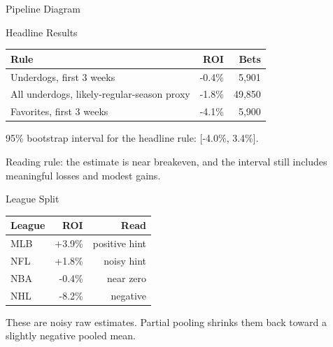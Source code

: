 \documentclass{beamer}
\begin{document}
\begin{frame}{Pipeline Diagram}
\centering
{}
\end{frame}

\begin{frame}{Headline Results}
\begin{tabular}{lrr}
\toprule
Rule & ROI & Bets \\
\midrule
Underdogs, first 3 weeks & -0.4\% & 5,901 \\
All underdogs, likely-regular-season proxy & -1.8\% & 49,850 \\
Favorites, first 3 weeks & -4.1\% & 5,900 \\
\bottomrule
\end{tabular}

\vspace{0.4cm}

95\% bootstrap interval for the headline rule: [-4.0\%, 3.4\%].

\vspace{0.2cm}

Reading rule: the estimate is near breakeven, and the interval still includes
meaningful losses and modest gains.
\end{frame}

\begin{frame}{League Split}
\begin{tabular}{lrr}
\toprule
League & ROI & Read \\
\midrule
MLB & +3.9\% & positive hint \\
NFL & +1.8\% & noisy hint \\
NBA & -0.4\% & near zero \\
NHL & -8.2\% & negative \\
\bottomrule
\end{tabular}
\vspace{0.5cm}

These are noisy raw estimates. Partial pooling shrinks them back toward a
slightly negative pooled mean.
\end{frame}
\end{document}
